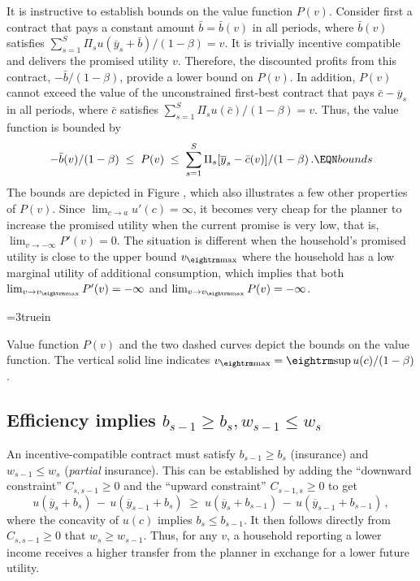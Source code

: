 It is instructive to establish bounds on the value function $P(v)$.
Consider first a contract that pays a constant amount $\bar b = \bar b(v)$ in all
periods, where $\bar b(v)$ satisfies $\sum_{s=1}^S \Pi_s u(\overline y_s + \bar b)
/(1-\beta) = v$. It is trivially incentive compatible and delivers
the promised utility $v$. Therefore, the discounted profits from this
contract, $- \bar b / (1 -\beta)$,
 provide a lower bound on $P(v)$. In addition, $P(v)$
cannot exceed the value of the unconstrained first-best contract that
pays $\bar c - \overline y_s$ in all periods, where $\bar c$ satisfies
$\sum_{s=1}^S \Pi_s u(\bar c) /(1-\beta) = v$. Thus, the
value function is bounded by
$$
-\bar b(v) / (1-\beta) \;\leq\; P(v) \;\leq\;
             \sum_{s=1}^S \Pi_s [\overline y_s - \bar c(v)]/(1-\beta) \,.  \EQN bounds
$$
The bounds are depicted in Figure %
, which also illustrates a few
other properties of $P(v)$. Since $\lim_{c\rightarrow a}u'(c)=\infty$,
it becomes very cheap for the planner to increase the promised
utility when the current promise is very low, that is,
$\lim_{v\rightarrow -\infty}P'(v)=0$. The situation is different
when the household's promised utility is close to the upper
bound $v_{\rm max}$ where the household has a low marginal utility
of additional consumption, which implies that both
$\lim_{v\rightarrow v_{\rm max}}P'(v)=-\infty$ and
$\lim_{v\rightarrow v_{\rm max}}P(v)=-\infty$.


\centerline{\epsfxsize=3truein}
\caption{Value function $P(v)$ and the two dashed curves depict the bounds on the
value function. The vertical solid line indicates $v_{\rm max}={\rm sup}\,u(c)/(1-\beta)$.}
\endfigure


\subsection{Efficiency implies $b_{s-1} \geq b_s, w_{s-1} \leq w_s$}

An incentive-compatible contract must satisfy $b_{s-1}\geq b_s$ (insurance)  and
$w_{s-1}\leq w_s$ ({\it partial\/} insurance).  This  can be established by adding the ``downward
constraint'' $C_{s,s-1}\geq 0$ and the ``upward constraint''
$C_{s-1,s}\geq 0$ to get
$$
u(\overline y_s + b_s) \,-\, u(\overline y_{s-1} + b_s) \;\geq\;
u(\overline y_s + b_{s-1}) \,-\, u(\overline y_{s-1} + b_{s-1})\,,
$$
where the concavity of $u(c)$ implies $b_s\leq b_{s-1}$.
It then follows directly from
$C_{s,s-1}\geq 0$ that $w_s \geq w_{s-1}$.
Thus, for any $v$, a household reporting a lower income receives a
higher transfer from the planner in exchange for a lower
future utility.

